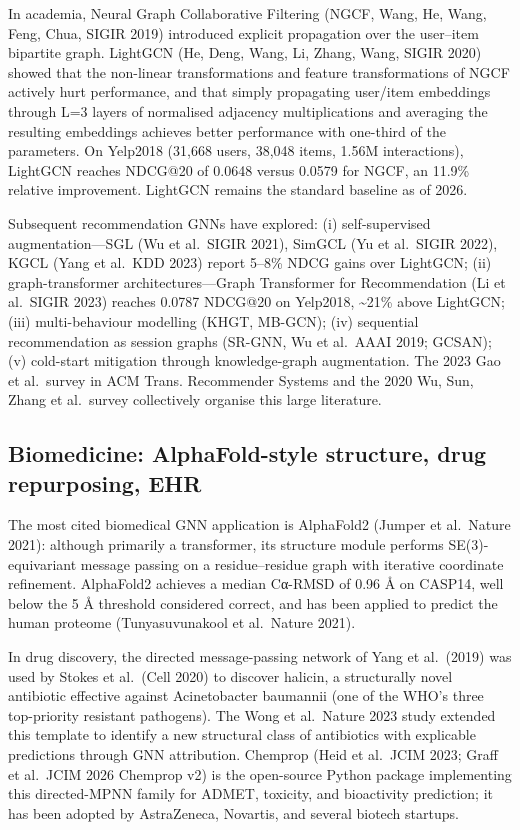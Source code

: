 In academia, Neural Graph Collaborative Filtering (NGCF, Wang, He, Wang, Feng, Chua, SIGIR 2019) introduced explicit propagation over the user--item bipartite graph. LightGCN (He, Deng, Wang, Li, Zhang, Wang, SIGIR 2020) showed that the non-linear transformations and feature transformations of NGCF actively hurt performance, and that simply propagating user/item embeddings through L=3 layers of normalised adjacency multiplications and averaging the resulting embeddings achieves better performance with one-third of the parameters. On Yelp2018 (31,668 users, 38,048 items, 1.56M interactions), LightGCN reaches NDCG@20 of 0.0648 versus 0.0579 for NGCF, an 11.9\% relative improvement. LightGCN remains the standard baseline as of 2026.

Subsequent recommendation GNNs have explored: (i) self-supervised augmentation---SGL (Wu et al.~SIGIR 2021), SimGCL (Yu et al.~SIGIR 2022), KGCL (Yang et al.~KDD 2023) report 5--8\% NDCG gains over LightGCN; (ii) graph-transformer architectures---Graph Transformer for Recommendation (Li et al.~SIGIR 2023) reaches 0.0787 NDCG@20 on Yelp2018, \textasciitilde21\% above LightGCN; (iii) multi-behaviour modelling (KHGT, MB-GCN); (iv) sequential recommendation as session graphs (SR-GNN, Wu et al.~AAAI 2019; GCSAN); (v) cold-start mitigation through knowledge-graph augmentation. The 2023 Gao et al.~survey in ACM Trans. Recommender Systems and the 2020 Wu, Sun, Zhang et al.~survey collectively organise this large literature.

\subsection{Biomedicine: AlphaFold-style structure, drug repurposing, EHR}\label{biomedicine-alphafold-style-structure-drug-repurposing-ehr}

The most cited biomedical GNN application is AlphaFold2 (Jumper et al.~Nature 2021): although primarily a transformer, its structure module performs SE(3)-equivariant message passing on a residue--residue graph with iterative coordinate refinement. AlphaFold2 achieves a median Cα-RMSD of 0.96 Å on CASP14, well below the 5 Å threshold considered correct, and has been applied to predict the human proteome (Tunyasuvunakool et al.~Nature 2021).

In drug discovery, the directed message-passing network of Yang et al.~(2019) was used by Stokes et al.~(Cell 2020) to discover halicin, a structurally novel antibiotic effective against Acinetobacter baumannii (one of the WHO's three top-priority resistant pathogens). The Wong et al.~Nature 2023 study extended this template to identify a new structural class of antibiotics with explicable predictions through GNN attribution. Chemprop (Heid et al.~JCIM 2023; Graff et al.~JCIM 2026 Chemprop v2) is the open-source Python package implementing this directed-MPNN family for ADMET, toxicity, and bioactivity prediction; it has been adopted by AstraZeneca, Novartis, and several biotech startups.

